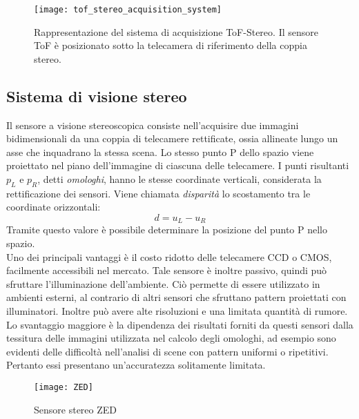 \begin{figure}[ht]
    \centering
    \texttt{[image: tof\_stereo\_acquisition\_system]}
    \caption[Sistema di acquisizione ToF-Stereo]{Rappresentazione del sistema di acquisizione ToF-Stereo. Il sensore ToF è posizionato sotto la telecamera di riferimento della coppia stereo.}
    \label{sistema_di_acquisizione}
\end{figure}

\subsection{Sistema di visione stereo}
Il sensore a visione stereoscopica consiste nell'acquisire due immagini bidimensionali da una coppia di telecamere rettificate, ossia allineate lungo un asse che inquadrano la stessa scena. Lo stesso punto P dello spazio viene proiettato nel piano dell'immagine di ciascuna delle telecamere. I punti risultanti \(p_L\) e \(p_R\), detti \textit{omologhi}, hanno le stesse coordinate verticali, considerata la rettificazione dei sensori. Viene chiamata \textit{disparità} lo scostamento tra le coordinate orizzontali: \[d = u_L - u_R\] Tramite questo valore è possibile determinare la posizione del punto P nello spazio.\\
Uno dei principali vantaggi è il costo ridotto delle telecamere CCD o CMOS, facilmente accessibili nel mercato. Tale sensore è inoltre passivo, quindi può sfruttare l’illuminazione dell’ambiente. Ciò permette di essere utilizzato in ambienti esterni, al contrario di altri sensori che sfruttano
pattern proiettati con illuminatori. Inoltre può avere alte risoluzioni e una limitata quantità di rumore.\\
Lo svantaggio maggiore è la dipendenza dei risultati forniti da questi sensori dalla tessitura delle immagini utilizzata nel calcolo degli omologhi, ad esempio sono evidenti delle difficoltà nell'analisi di scene con pattern uniformi o ripetitivi. Pertanto essi presentano un’accuratezza solitamente limitata.

\begin{figure}[ht]
    \centering
    \texttt{[image: ZED]}
    \caption[Sensore di visione stereo]{Sensore stereo ZED}
    \label{zed}
\end{figure}

